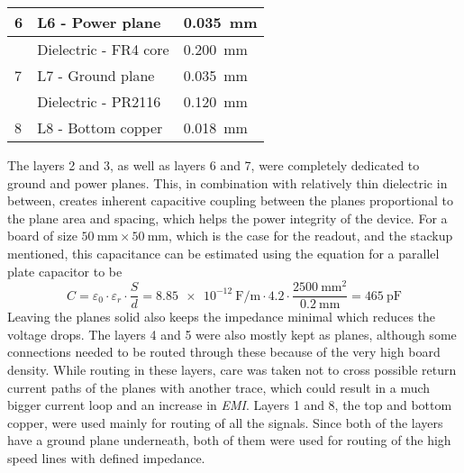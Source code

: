 \begin{table}[htp!]
\begin{tabular}{|l|l|l|}
    6                                    & L6 - Power plane                   & \SI{0.035}{\milli\meter}                                   \\ \hline
                                         & Dielectric - FR4 core              & \SI{0.200}{\milli\meter}                                   \\ \hline
    7                                    & L7 - Ground plane                  & \SI{0.035}{\milli\meter}                                   \\ \hline
                                         & Dielectric - PR2116                & \SI{0.120}{\milli\meter}                                   \\ \hline
    8                                    & L8 - Bottom copper                 & \SI{0.018}{\milli\meter}                                   \\ \hline
    \end{tabular}
    \label{tab:stackup}
\end{table}
\FloatBarrier
The layers 2 and 3, as well as layers 6 and 7, were completely dedicated to ground and power planes. This, in combination with relatively thin dielectric in between, creates inherent capacitive coupling between the planes proportional to the plane area and spacing, which helps the power integrity of the device. For a board of size $\SI{50}{\milli\meter} \times \SI{50}{\milli\meter}$, which is the case for the readout, and the stackup mentioned, this capacitance can be estimated using the equation for a parallel plate capacitor to be
%
\begin{equation}
C = \varepsilon_0 \cdot \varepsilon_r \cdot \frac{S}{d} = \SI{8.85e-12}{\farad\per\meter} \cdot 4.2 \cdot \frac{\SI{2500}{\milli\meter\squared}}{\SI{0.2}{\milli\meter}} = \SI{465}{\pico\farad}
\end{equation}
%
Leaving the planes solid also keeps the impedance minimal which reduces the voltage drops. The layers 4 and 5 were also mostly kept as planes, although some connections needed to be routed through these because of the very high board density. While routing in these layers, care was taken not to cross possible return current paths of the planes with another trace, which could result in a much bigger current loop and an increase in \emph{EMI}. Layers 1 and 8, the top and bottom copper, were used mainly for routing of all the signals. Since both of the layers have a ground plane underneath, both of them were used for routing of the high speed lines with defined impedance. 
%
